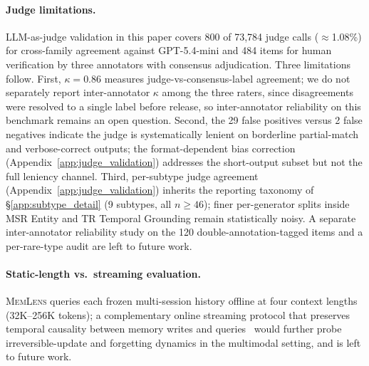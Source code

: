 \documentclass{llmxive}
\providecommand{\bench}{\textsc{MemLens}}
\begin{document}
\paragraph{Judge limitations.}
LLM-as-judge validation in this paper covers 800 of 73{,}784 judge calls (${\approx}$1.08\%) for cross-family agreement against GPT-5.4-mini and 484 items for human verification by three annotators with consensus adjudication.
Three limitations follow.
First, $\kappa = 0.86$ measures judge-vs-consensus-label agreement; we do not separately report inter-annotator $\kappa$ among the three raters, since disagreements were resolved to a single label before release, so inter-annotator reliability on this benchmark remains an open question.
Second, the 29 false positives versus 2 false negatives indicate the judge is systematically lenient on borderline partial-match and verbose-correct outputs; the format-dependent bias correction (Appendix~\ref{app:judge_validation}) addresses the short-output subset but not the full leniency channel.
Third, per-subtype judge agreement (Appendix~\ref{app:judge_validation}) inherits the reporting taxonomy of \S\ref{app:subtype_detail} (9 subtypes, all $n \geq 46$); finer per-generator splits inside MSR Entity and TR Temporal Grounding remain statistically noisy.
A separate inter-annotator reliability study on the 120 double-annotation-tagged items and a per-rare-type audit are left to future work.

\paragraph{Static-length vs.\ streaming evaluation.}
\bench{} queries each frozen multi-session history offline at four context lengths (32K--256K tokens); a complementary online streaming protocol that preserves temporal causality between memory writes and queries~\cite{zheng2026lifedialbench} would further probe irreversible-update and forgetting dynamics in the multimodal setting, and is left to future work.
\end{document}
